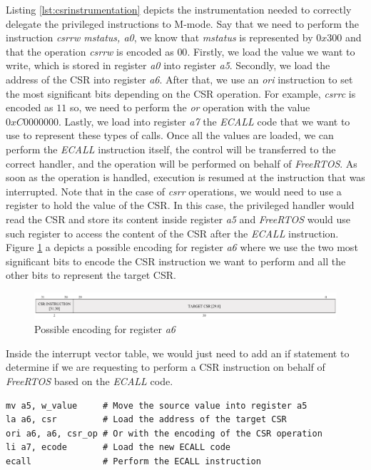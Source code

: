 Listing \ref{lst:csrinstrumentation} depicts the instrumentation needed to
correctly delegate the privileged instructions to M-mode. Say that we need to perform
the instruction \textit{csrrw mstatus, a0}, we know that \textit{mstatus} is
represented by $0x300$ and that the operation \textit{csrrw} is encoded as $00$.
Firstly, we load the value we want to write, which is stored in register \textit{a0}
into register \textit{a5}. Secondly, we load the address of the CSR into
register \textit{a6}. After that, we use an \textit{ori} instruction to set the
most significant bits depending on the CSR operation. For example, \textit{csrrc}
is encoded as $11$ so, we need to perform the \textit{or} operation with the value
$0xC00000 00$. Lastly, we load into register \textit{a7} the \textit{ECALL} code
that we want to use to represent these types of calls. Once all the values are
loaded, we can perform the \textit{ECALL} instruction itself, the control will be
transferred to the correct handler, and the operation will be performed on
behalf of \textit{FreeRTOS}. As soon as the operation is handled, execution is resumed
at the instruction that was interrupted. Note that in the case of \textit{csrr} operations,
we would need to use a register to hold the value of the CSR. In this case, the
privileged handler would read the CSR and store its content inside register
\textit{a5} and \textit{FreeRTOS} would use such register to access the content
of the CSR after the \textit{ECALL} instruction. Figure \ref{fig:a6encoding} a
depicts a possible encoding for register \textit{a6} where we use the two most significant
bits to encode the CSR instruction we want to perform and all the other bits to represent
the target CSR. \\
\begin{figure}[htbp]
  \centering
  \includegraphics[width=.9\linewidth]{images/freertos_encoding.png}
  \caption{Possible encoding for register \textit{a6}}
  \label{fig:a6encoding}
\end{figure}

Inside the interrupt vector table, we would just need to add an if statement to
determine if we are requesting to perform a CSR instruction on behalf of \textit{FreeRTOS}
based on the \textit{ECALL} code. \\ \begin{lstlisting}[style=Assembly, caption = \textit{FreeRTOS} instrumentation for Control and Status Register operations, label={lst:csrinstrumentation}]
mv a5, w_value     # Move the source value into register a5
la a6, csr         # Load the address of the target CSR
ori a6, a6, csr_op # Or with the encoding of the CSR operation
li a7, ecode       # Load the new ECALL code
ecall              # Perform the ECALL instruction
\end{lstlisting}

